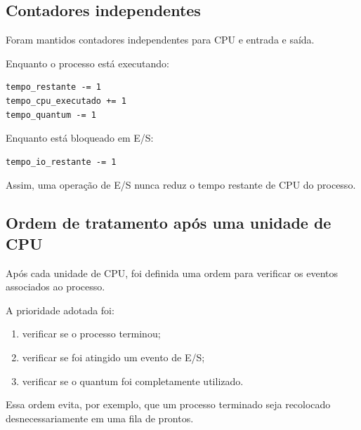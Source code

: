 \documentclass[12pt,a4paper]{article}
\begin{document}
\subsection{Contadores independentes}

Foram mantidos contadores independentes para CPU e entrada e saída.

Enquanto o processo está executando:

\begin{lstlisting}
tempo_restante -= 1
tempo_cpu_executado += 1
tempo_quantum -= 1
\end{lstlisting}

Enquanto está bloqueado em E/S:

\begin{lstlisting}
tempo_io_restante -= 1
\end{lstlisting}

Assim, uma operação de E/S nunca reduz o tempo restante de CPU do
processo.



\subsection{Ordem de tratamento após uma unidade de CPU}

Após cada unidade de CPU, foi definida uma ordem para verificar os
eventos associados ao processo.

A prioridade adotada foi:

\begin{enumerate}

    \item verificar se o processo terminou;

    \item verificar se foi atingido um evento de E/S;

    \item verificar se o quantum foi completamente utilizado.

\end{enumerate}

Essa ordem evita, por exemplo, que um processo terminado seja
recolocado desnecessariamente em uma fila de prontos.


\end{document}

